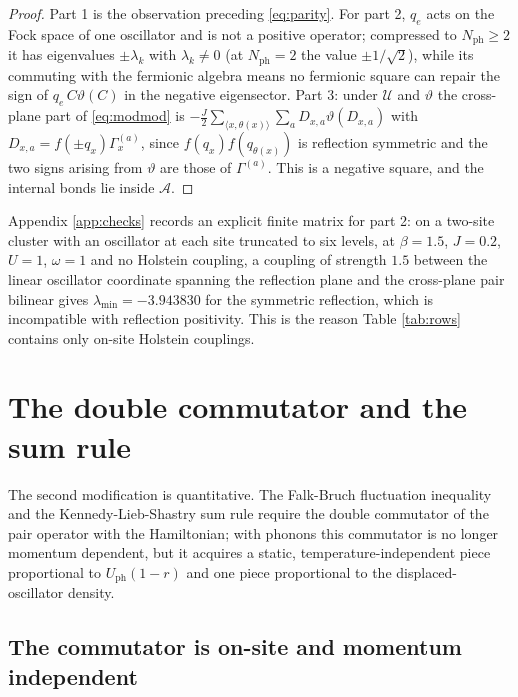 \documentclass[11pt]{article}
\numberwithin{equation}{section}
\newcommand{\Gam}{\Gamma}
\newcommand{\fN}{N_{\mathrm{ph}}}
\theoremstyle{definition}
\begin{document}
\begin{proof}
Part 1 is the observation preceding \eqref{eq:parity}. For part 2, $q_{e}$ acts on the Fock space of
one oscillator and is not a positive operator; compressed to $\fN\ge2$ it has eigenvalues
$\pm\lambda_{k}$ with $\lambda_{k}\ne0$ (at $\fN=2$ the value $\pm1/\sqrt2$), while its
commuting with the fermionic algebra means no fermionic square can repair the sign of
$q_{e}\,C\vartheta(C)$ in the negative eigensector. Part 3: under $\mathcal{U}$ and
$\vartheta$ the cross-plane part of \eqref{eq:modmod} is
$-\frac{J}{2}\sum_{\langle x,\theta(x)\rangle}\sum_{a}D_{x,a}\vartheta(D_{x,a})$ with
$D_{x,a}=f(\pm q_{x})\Gam^{(a)}_{x}$, since $f(q_{x})f(q_{\theta(x)})$ is reflection
symmetric and the two signs arising from $\vartheta$ are those of $\Gam^{(a)}$. This is a
negative square, and the internal bonds lie inside $\mathcal{A}$.
\end{proof}

Appendix \ref{app:checks} records an explicit finite matrix for part 2: on a two-site
cluster with an oscillator at each site truncated to six levels, at $\beta=1.5$, $J=0.2$,
$U=1$, $\omega=1$ and no Holstein coupling, a coupling of strength $1.5$ between the
linear oscillator coordinate spanning the reflection plane and the cross-plane pair
bilinear gives $\lambda_{\min}=-3.943830$ for the symmetric reflection, which is
incompatible with reflection positivity. This is the reason Table \ref{tab:rows}
contains only on-site Holstein couplings.

\section{The double commutator and the sum rule}\label{sec:sumrule}

The second modification is quantitative. The Falk-Bruch fluctuation inequality and the
Kennedy-Lieb-Shastry sum rule require the double commutator of the pair operator with the
Hamiltonian; with phonons this commutator is no longer momentum dependent, but it
acquires a static, temperature-independent piece proportional to $U_{\mathrm{ph}}(1-r)$
and one piece proportional to the displaced-oscillator density.

\subsection{The commutator is on-site and momentum independent}
\end{document}
